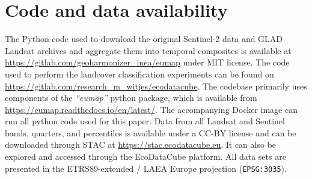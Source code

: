 \section*{Code and data availability}
The Python code used to download the original Sentinel-2 data and GLAD Landsat archives and aggregate them into temporal composites is available at \url{https://gitlab.com/geoharmonizer\_inea/eumap} under MIT license. The code used to perform the landcover classification experiments can be found on \url{https://gitlab.com/research_m_witjes/ecodatacube}. The codebase primarily uses components of the \emph{``eumap''} python package, which is available from \url{https://eumap.readthedocs.io/en/latest/}. The accompanying Docker image can run all python code used for this paper. Data from all Landsat and Sentinel bands, quarters, and percentiles is available under a CC-BY license and can be downloaded through STAC at \url{https://stac.ecodatacube.eu}. It can also be explored and accessed through the EcoDataCube platform. All data sets are presented in the ETRS89-extended / LAEA Europe projection (\texttt{EPSG:3035}).

